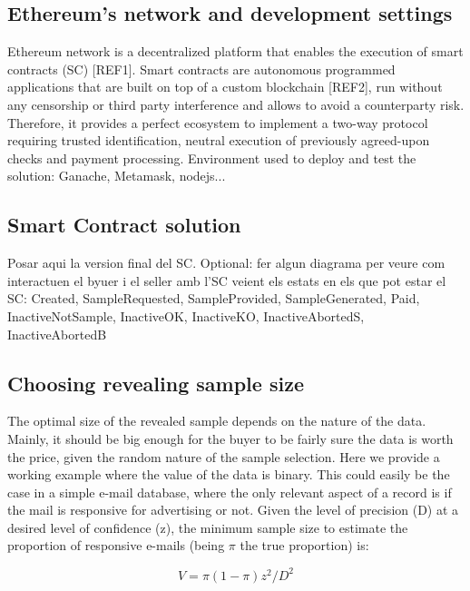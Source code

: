 \documentclass[]{article}
\begin{document}
	\subsection{Ethereum's network and development settings}
	Ethereum network is a decentralized platform that enables the execution of smart contracts (SC) [REF1]. Smart contracts are autonomous programmed applications that are built on top of a custom blockchain [REF2], run without any censorship or third party interference and allows to avoid a counterparty risk. Therefore, it provides a perfect ecosystem to implement a two-way protocol requiring trusted identification, neutral execution of previously agreed-upon checks and payment processing.
	Environment used to deploy and test the solution: Ganache, Metamask, nodejs...
	
	\subsection{Smart Contract solution}
	Posar aqui la version final del SC. Optional: fer algun diagrama per veure com interactuen el byuer i el seller amb l'SC veient els estats en els que pot estar el SC: Created, SampleRequested, SampleProvided, SampleGenerated, Paid, InactiveNotSample, InactiveOK, InactiveKO, InactiveAbortedS, InactiveAbortedB

	\subsection{Choosing revealing sample size}
	The optimal size of the revealed sample depends on the nature of the data. Mainly, it should be big enough for the buyer to be fairly sure the data is worth the price, given the random nature of the sample selection. Here we provide a working example where the value of the data is binary. This could easily be the case in a simple e-mail database, where the only relevant aspect of a record is if the mail is responsive for advertising or not.
	Given the level of precision (D) at a desired level of confidence (z), the minimum sample size to estimate the proportion of responsive e-mails (being $\pi$ the true proportion) is:
	
	\begin{equation}
	V = \pi(1-\pi)z^2/D^2
	\end{equation}   
	
\end{document}
